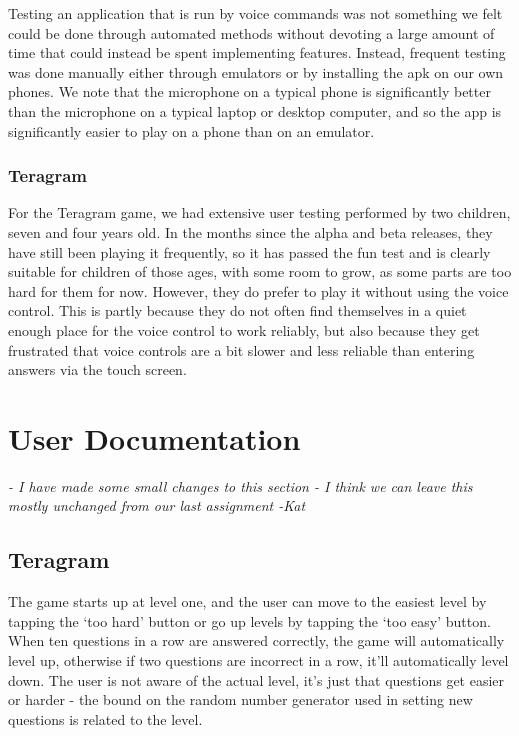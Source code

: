 \documentclass[11pt, oneside]{article}
\begin{document}
Testing an application that is run by voice commands was not something
we felt could be done through automated methods without devoting a
large amount of time that could instead be spent implementing
features. Instead, frequent testing was done manually either through
emulators or by installing the apk on our own phones. We note that the
microphone on a typical phone is significantly better than the
microphone on a typical laptop or desktop computer, and so the app is
significantly easier to play on a phone than on an emulator.


\subsubsection*{Teragram}

For the Teragram game, we had extensive user testing performed by two
children, seven and four years old. In the months since the alpha and beta
releases, they have still been playing it frequently, so it has passed
the fun test and is clearly suitable for children of those ages, with
some room to grow, as some parts are too hard for them for
now. However, they do prefer to play it without using the voice
control. This is partly because they do not often find themselves in a
quiet enough place for the voice control to work reliably, but also
because they get frustrated that voice controls are a bit slower and
less reliable than entering answers via the touch screen.

\pagebreak

\section{User Documentation}

{\em - I have made some small changes to this section - I think we can leave this mostly unchanged from our last assignment -Kat}

\subsection{Teragram}

The game starts up at level one, and the user can move to the easiest
level by tapping the `too hard' button or go up levels by tapping the
`too easy' button. When ten questions in a row are answered correctly,
the game will automatically level up, otherwise if two questions are incorrect in a 
row, it'll automatically level down.  The user is not aware of the actual level, it's just that
questions get easier or harder - the bound on the random number
generator used in setting new questions is related to the level.
\end{document}
